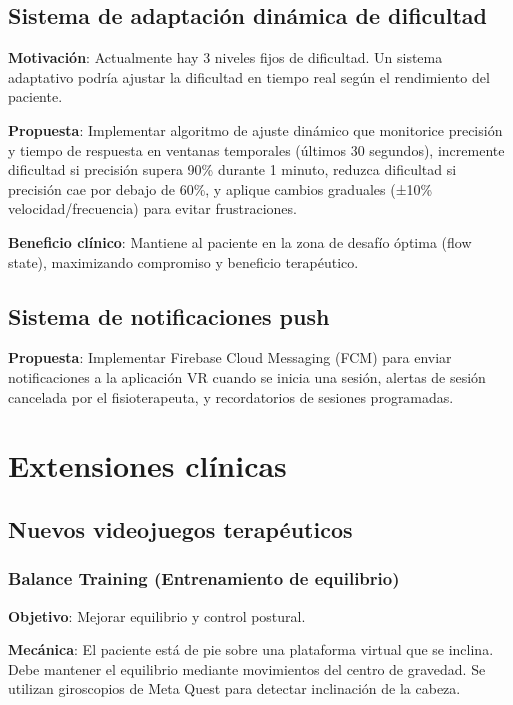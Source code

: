 \subsection{Sistema de adaptación dinámica de dificultad}

\textbf{Motivación}: Actualmente hay 3 niveles fijos de dificultad. Un sistema adaptativo podría ajustar la dificultad en tiempo real según el rendimiento del paciente.

\textbf{Propuesta}: Implementar algoritmo de ajuste dinámico que monitorice precisión y tiempo de respuesta en ventanas temporales (últimos 30 segundos), incremente dificultad si precisión supera 90\% durante 1 minuto, reduzca dificultad si precisión cae por debajo de 60\%, y aplique cambios graduales (±10\% velocidad/frecuencia) para evitar frustraciones.

\textbf{Beneficio clínico}: Mantiene al paciente en la zona de desafío óptima (flow state), maximizando compromiso y beneficio terapéutico.

\subsection{Sistema de notificaciones push}

\textbf{Propuesta}: Implementar Firebase Cloud Messaging (FCM) para enviar notificaciones a la aplicación VR cuando se inicia una sesión, alertas de sesión cancelada por el fisioterapeuta, y recordatorios de sesiones programadas.

\section{Extensiones clínicas}

\subsection{Nuevos videojuegos terapéuticos}

\subsubsection{Balance Training (Entrenamiento de equilibrio)}

\textbf{Objetivo}: Mejorar equilibrio y control postural.

\textbf{Mecánica}: El paciente está de pie sobre una plataforma virtual que se inclina. Debe mantener el equilibrio mediante movimientos del centro de gravedad. Se utilizan giroscopios de Meta Quest para detectar inclinación de la cabeza.

